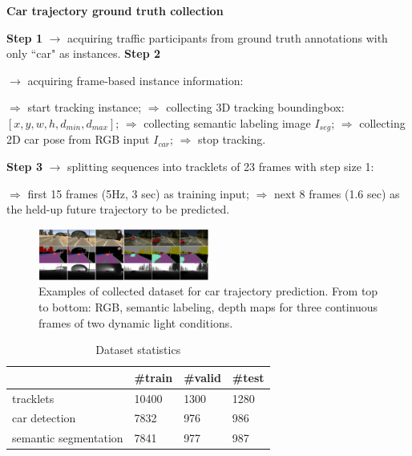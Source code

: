 \documentclass[10pt,twocolumn,letterpaper]{article}
\newlength\myindent
\newcommand\bindent[1][\myindent]{%
  \begingroup
  \setlength{\itemindent}{#1}
  \addtolength{\algorithmicindent}{#1}
}
\newcommand\eindent{\endgroup}
\newcommand{\ra}[1]{\renewcommand{\arraystretch}{#1}}
\begin{document}
\begin{algorithm}[h]
\begin{algorithmic}
\caption{\textbf{Car trajectory ground truth collection}}\label{list:dataset_collection}
\STATE \textbf{Step 1} $\rightarrow $ acquiring traffic participants from ground truth annotations with only ``car" as instances.
\STATE \textbf{Step 2} {$\rightarrow $ acquiring frame-based instance information:
{
\bindent
    \STATE $\Rightarrow$ start tracking instance;
    \STATE $\Rightarrow$ collecting 3D tracking boundingbox: $[x, y, w, h, d_{min}, d_{max}]$;
    \STATE $\Rightarrow$ collecting semantic labeling image $I_{seg}$;
    \STATE $\Rightarrow$ collecting 2D car pose from RGB input $I_{car}$;
    \STATE $\Rightarrow$ stop tracking.
    \ENDIF\eindent}
  }
\STATE \textbf{Step 3} $\rightarrow $ splitting sequences into tracklets of 23 frames with step size 1:
{\bindent
    \STATE $\Rightarrow$  first 15 frames (5Hz, 3 sec) as training input;
  \STATE $\Rightarrow$  next 8 frames (1.6 sec) as the held-up future trajectory to be predicted.
  \eindent}

\end{algorithmic}
\end{algorithm}

\begin{figure}[t]
        \centering
        \includegraphics[width=0.5\textwidth]{figures/dataset.pdf}
        \caption{ {\small Examples of collected dataset for car trajectory prediction. From top to bottom: RGB, semantic labeling, depth maps for three continuous frames of two dynamic light conditions.}}
        \label{fig:dataset}
\end{figure}

\begin{table}\centering
\ra{1.}
\begin{tabular}{@{}llll@{}}\toprule

                & \#train & \#valid & \#test\\
 \hline
 tracklets      &  10400    &  1300    & 1280 \\
 \hline
 car detection  &   7832     & 976     & 986 \\
 \hline
 semantic segmentation  &  7841  & 977  & 987 \\
 \hline
\end{tabular}
\caption{Dataset statistics}
\label{tab:dataset_statistics}
\end{table}
\end{document}

